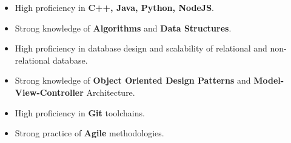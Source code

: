 \documentclass[12pt]{article} %
\begin{document}
\begin{paracol}{2}
\begin{itemize}
	\item High proficiency in \textbf{C++, Java, Python, NodeJS}.
	\item Strong knowledge of \textbf{Algorithms} and \textbf{Data Structures}.
	\item High proficiency in database design and scalability of relational and non-relational database.
	\item Strong knowledge of \textbf{Object Oriented Design Patterns} and \textbf{Model-View-Controller} Architecture.
	\item High proficiency in \textbf{Git} toolchains.
	\item Strong practice of \textbf{Agile} methodologies.
\end{itemize}	









\end{paracol}
\end{document}
